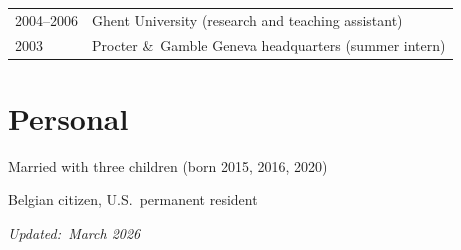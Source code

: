 \documentclass[a4paper]{article}
\begin{document}
\begin{tabular}{p{2cm} p{14.7cm}}
2004--2006 & Ghent University (research and teaching assistant)\\[0.25cm]

2003 & Procter \&\ Gamble Geneva headquarters (summer intern)
\end{tabular}


\section*{Personal}

Married with three children (born 2015, 2016, 2020)

Belgian citizen, U.S.\ permanent resident

\bigskip

\bigskip

\bigskip

\bigskip


\qquad \qquad \qquad \qquad \qquad \qquad \qquad \qquad \qquad \qquad
\qquad \qquad \qquad \qquad \qquad \qquad \textit{Updated:\ March 2026}
\end{document}
